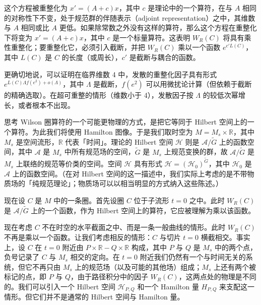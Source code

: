 这个方程被重整化为 $x'=(A+c)x$，其中 $c$ 是理论中的一个算符，在与 $A$ 相同的对称性下不变，处于规范群的伴随表示（adjoint representation）之中，其维数与 $A$ 相同或比 $A$ 更低。如果除常数之外没有这样的算符，那么这个方程在重整化下将变为 $x'=(A+c)x$，其中 $c$ 是一个标量算符。这表明 $W_R(C)$ 将具有乘性重整化；要重整化它，必须引入截断，并把 $W_R(C)$ 乘以一个函数 $e^{c'L(C)}$，其中 $L(C)$ 是 $C$ 的长度（或周长），$c'$ 是截断与耦合的函数。

更确切地说，可以证明在临界维数 4 中，发散的重整化因子具有形式 $e^{L(C)\Lambda f(e^2)+o(\Lambda)}$，其中 $\Lambda$ 是截断，$f(e^2)$ 可以用微扰论计算（但依赖于截断的精确选取）。在超可重整的情形（维数小于 4），发散因子按 $\Lambda$ 的较低次幂增长，或者根本不出现。

思考 Wilson 圈算符的一个可能更物理的方式，是把它等同于 Hilbert 空间上的一个算符。为此我们将使用 Hamilton 图像。于是我们取时空为 $M=M_s\times\mathbb{R}$，其中 $M_s$ 是空间流形，$\mathbb{R}$ 代表「时间」。理论的 Hilbert 空间 $\mathcal{H}$ 则是 $\mathcal{A}/\widetilde{G}$ 上的函数空间，其中 $\mathcal{A}$ 是 $M_s$ 中所有规范场的空间，$\widetilde{G}$ 是 $M_s$ 上规范变换的群，故 $\mathcal{A}/\widetilde{G}$ 是 $M_s$ 上联络的规范等价类的空间。空间 $\mathcal{H}$ 具有形式 $\mathcal{H}=(\mathcal{H}_0)^{\widetilde{G}}$，其中 $\mathcal{H}_0$ 是 $\mathcal{A}$ 上的函数空间。（在对 Hilbert 空间的这一描述中，我们实际上考虑的是不带物质场的「纯规范理论」；物质场可以以相当明显的方式纳入这些陈述。）

现在设 $C$ 是 $M$ 中的一条圈。首先设圈 $C$ 位于子流形 $t=0$ 之中。此时 $W_R(C)$ 是 $\mathcal{A}/\widetilde{G}$ 上的一个函数，作为 Hilbert 空间上的算符，它应被理解为乘以该函数。

现在考虑 $C$ 不在时空的水平截面之中、而是一条一般曲线的情形。此时 $W_R(C)$ 不再是乘以一个函数。让我们考虑相反的情形：$C$ 与切片 $t=0$ 横截相交。事实上，设 $C$ 在 $t=0$ 附近由 $P\times\mathbb{R}-Q\times\mathbb{R}$ 构成，其中 $P$ 与 $Q$ 是 $M_s$ 中的两个点，负号记录了 $C$ 与 $M_s$ 相交的定向。在 $t=0$ 附近我们仍然有一个与时间无关的系统，但它不再只由 $M_s$ 上的规范场（以及可能的其他场）组成；$M_s$ 上还有两个被标记的点，即 $P$ 与 $Q$，由于路径积分中的因子 $W_R(C)$，这两点处的物理是不同的。我们可以引入一个 Hilbert 空间 $\mathcal{H}_{P,Q}$ 和一个 Hamilton 量 $H_{P,Q}$ 来支配这一情形。但它们并不是通常的 Hilbert 空间与 Hamilton 量。


